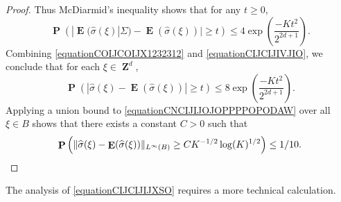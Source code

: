 \documentclass[12pt,reqno]{article}
\numberwithin{equation}{section}
\DeclareMathOperator{\ZZ}{\mathbf{Z}}
\numberwithin{theorem}{section}
\DeclareMathOperator{\EE}{\mathbf{E}}
\DeclareMathOperator{\PP}{\mathbf{P}}
\begin{document}
\begin{proof}
    Thus McDiarmid's inequality shows that for any $t \geq 0$,
    \begin{equation} \label{equationCIJCIJIVJIO}
        \PP \left( |\EE(\widehat{\sigma}(\xi)|\Sigma) - \EE(\widehat{\sigma}(\xi))| \geq t \right) \leq 4 \exp \left( \frac{-K t^2}{2^{2d+1}} \right).
    \end{equation}
    Combining \eqref{equationCOIJCOIJX1232312} and \eqref{equationCIJCIJIVJIO}, we conclude that for each $\xi \in \ZZ^d$,
    \begin{equation} \label{equationCNCIJIJOJOPPPPOPODAW}
        \PP \left( | \widehat{\sigma}(\xi) - \EE(\widehat{\sigma}(\xi)) | \geq t  \right) \leq 8 \exp \left( \frac{-K t^2}{2^{2d + 1}} \right).
    \end{equation}
    Applying a union bound to \eqref{equationCNCIJIJOJOPPPPOPODAW} over all $\xi \in B$ shows that there exists a constant $C > 0$ such that
    \[ \PP \left( \| \widehat{\sigma}(\xi) - \EE(\widehat{\sigma}(\xi)) \|_{L^\infty(B)} \geq C K^{-1/2} \log(K)^{1/2} \right) \leq 1/10. \qedhere \]
\end{proof}

The analysis of \eqref{equationCIJCIJIJXSO} requires a more technical calculation.
\end{document}
